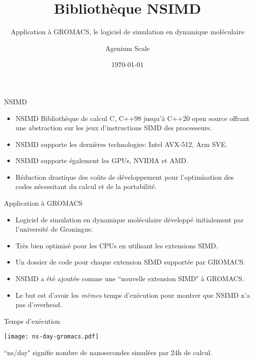 \documentclass[shrink, compress, mathserif, 10pt, xcolor=dvipsnames,
               aspectratio=169]{beamer}
\title{Bibliothèque NSIMD}
\subtitle{Application à GROMACS, le logiciel de simulation en dynamique
          moléculaire}
\date{\today}
\author{Agenium Scale}
\begin{document}
\begin{frame}[plain]
  \maketitle
\end{frame}

\begin{frame}{NSIMD}
  \begin{itemize}
    \item
      NSIMD Bibliothèque de calcul C, C++98 jusqu'à C++20 open source offrant
      une abstraction sur les jeux d'instructions SIMD des processeurs.
    \item
      NSIMD supporte les dernières technologies: Intel AVX-512, Arm SVE.
    \item
      NSIMD supporte également les GPUs, NVIDIA et AMD.
    \item
      Réduction drastique des coûts de développement pour l'optimisation
      des codes nécessitant du calcul et de la portabilité.
  \end{itemize}
\end{frame}

\begin{frame}{Application à GROMACS}
  \begin{itemize}
    \item
      Logiciel de simulation en dynamique moléculaire développé initialement
      par l'université de Groningue.
    \item
      Très bien optimisé pour les CPUs en utilisant les extensions SIMD.
    \item
      Un dossier de code pour chaque extension SIMD supportée par GROMACS.
    \item
      NSIMD a été ajoutée comme une ``nouvelle extension SIMD" à GROMACS.
    \item
      Le but est d'avoir les \emph{mêmes} temps d'exécution pour montrer que
      NSIMD n'a pas d'overhead.
  \end{itemize}
\end{frame}

\begin{frame}{Temps d'exécution}
  \begin{center}
    \texttt{[image: ns-day-gromacs.pdf]}
  \end{center}

  ``ns/day" signifie nombre de nanosecondes simulées par 24h de calcul.
\end{frame}
\end{document}
